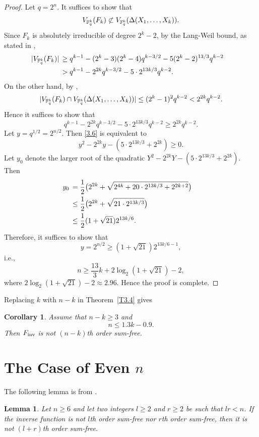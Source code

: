 \documentclass{amsart}
\newtheorem{lem}[thm]{Lemma}
\newtheorem{cor}[thm]{Corollary}
\numberwithin{equation}{section}
\theoremstyle{definition}
\newcommand{\f}{\Bbb F}
\newcommand{\fin}{F_{\text{\rm inv}}}
\begin{document}
\begin{proof}
Let $q=2^n$. It suffices to show that
\[
V_{\f_q^k}(F_k)\not\subset V_{\f_q^k}(\Delta(X_1,\dots,X_k)).
\]
Since $F_k$ is absolutely irreducible of degree $2^k-2$, by the Lang-Weil bound, as stated in \cite[Theorem~5.2]{Cafure-Matera-FFA-2006}, 
\begin{align*}
|V_{\f_q^k}(F_k)|\,&\ge q^{k-1}-(2^k-3)(2^k-4)q^{k-3/2}-5(2^k-2)^{13/3}q^{k-2}\cr
&>q^{k-1}-2^{2k}q^{k-3/2}-5\cdot 2^{13k/3}q^{k-2}.
\end{align*}
On the other hand, by \cite[Lemma~2.2]{Cafure-Matera-FFA-2006},
\[
|V_{\f_q^k}(F_k)\cap V_{\f_q^k}(\Delta(X_1,\dots,X_k))|\le (2^k-1)^2q^{k-2}<2^{2k}q^{k-2}.
\]
Hence it suffices to show that
\begin{equation}\label{3.6}
q^{k-1}-2^{2k}q^{k-3/2}-5\cdot 2^{13k/3}q^{k-2}\ge 2^{2k}q^{k-2}.
\end{equation}
Let $y=q^{1/2}=2^{n/2}$. Then \eqref{3.6} is equivalent to 
\[
y^2-2^{2k}y-(5\cdot 2^{13k/3}+2^{2k})\ge 0.
\]
Let $y_0$ denote the larger root of the quadratic $Y^2-2^{2k}Y-(5\cdot2^{13k/3}+2^{2k})$. Then
\begin{align*}
y_0\,&=\frac 12\bigl(2^{2k}+\sqrt{2^{4k}+20\cdot 2^{13k/3}+2^{2k+2}}\bigr)\cr
&\le\frac 12\bigl(2^{2k}+\sqrt{21\cdot 2^{13k/3}}\bigr)\cr
&\le \frac 12(1+\sqrt{21})2^{13k/6}.
\end{align*}
Therefore, it suffices to show that
\[
y=2^{n/2}\ge (1+\sqrt{21})2^{13k/6-1},
\]
i.e.,
\[
n\ge\frac{13}3k+2\log_2(1+\sqrt{21})-2,
\]
where $2\log_2(1+\sqrt{21})-2\approx 2.96$. Hence the proof is complete.
\end{proof}

Replacing $k$ with $n-k$ in Theorem~\ref{T3.4} gives
\begin{cor}\label{C3.5}
Assume that $n-k\ge 3$ and
\begin{equation}\label{3.7}
n\le 1.3k-0.9.
\end{equation}
Then $\fin$ is not $(n-k)$th order sum-free.
\end{cor}




\section{The Case of Even $n$}

The following lemma is from \cite{Carlet-pre}. 
\medskip

\begin{lem}\label{C5.1}
{\it Let $n\geq 6$ and let two integers $l\geq 2$ and $r\geq 2$ be such that $lr<n$. If the inverse function is not $l$th order sum-free nor $r$th order sum-free, then it is not $(l+r)$th order sum-free.}
\end{lem}
\end{document}
